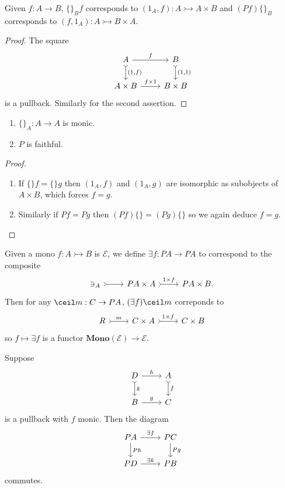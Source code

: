 \documentclass[a4paper]{article}
\renewcommand{\c}[1]{\mathbf{#1}}
\newcommand{\mono}{\rightarrowtail}
\begin{document}
\begin{lemma}
  Given \(f: A \to B\), \(\{\}_Bf\) corresponds to \((1_A, f): A \mono A \times B\) and \((Pf) \{\}_B\) corresponds to \((f, 1_A): A \mono B \times A\).
\end{lemma}

\begin{proof}
  The square
  \[
    \begin{tikzcd}
      A \ar[r, "f"] \ar[d, "{(1, f)}", tail] & B \ar[d, "{(1, 1)}", tail] \\
      A \times B \ar[r, "f \times 1"] & B \times B
    \end{tikzcd}
  \]
  is a pullback. Similarly for the second assertion.
\end{proof}

\begin{corollary}\leavevmode
  \begin{enumerate}
  \item \(\{\}_A: A \to A\) is monic.
  \item \(P\) is faithful.
  \end{enumerate}
\end{corollary}

\begin{proof}\leavevmode
  \begin{enumerate}
  \item If \(\{\}f = \{\}g\) then \((1_A, f)\) and \((1_A, g)\) are isomorphic as subobjects of \(A \times B\), which forces \(f = g\).
  \item Similarly if \(Pf = Pg\) then \((Pf)\{\} = (Pg)\{\}\) so we again deduce \(f = g\).
  \end{enumerate}
\end{proof}

Given a mono \(f: A \mono B\) is \(\mathcal E\), we define \(\exists f: PA \to PA\) to correspond to the composite
\[
  \begin{tikzcd}
    \ni_A \ar[r, tail] & PA \times A \ar[r, "1 \times f", tail] & PA \times B.
  \end{tikzcd}
\]
Then for any \(\ceil m: C \to PA\), \((\exists f) \ceil m\) correponds to
\[
  \begin{tikzcd}
    R \ar[r, "m", tail] & C \times A \ar[r, "1 \times f", tail] & C \times B
  \end{tikzcd}
\]
so \(f \mapsto \exists f\) is a functor \(\c{Mono}(\mathcal E) \to \mathcal E\).

\begin{lemma}
  Suppose
  \[
    \begin{tikzcd}
      D \ar[r, "h"] \ar[d, "k", tail] & A \ar[d, "f", tail] \\
      B \ar[r, "g"] & C
    \end{tikzcd}
  \]
  is a pullback with \(f\) monic. Then the diagram
  \[
    \begin{tikzcd}
      PA \ar[r, "\exists f"] \ar[d, "Ph"] & PC \ar[d, "Pg"] \\
      PD \ar[r, "\exists k"] & PB
    \end{tikzcd}
  \]
  commutes.
\end{lemma}
\end{document}
